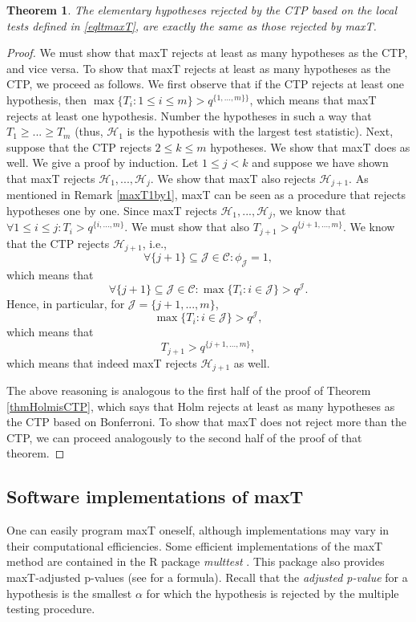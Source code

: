 \documentclass[11pt]{article}
\theoremstyle{plain}
\newtheorem{theorem}{Theorem}[section]
\theoremstyle{definition}
\newcommand{\J}{\mathcal{J}}
\newcommand{\Hy}{\mathcal{H}}
\newcommand{\subs}{\mathcal{C}}
\newcommand{\citp}{\citep}
\begin{document}
\begin{theorem}
The elementary hypotheses rejected by the CTP based on the local tests defined in \eqref{eqltmaxT}, are exactly the same as those rejected by maxT.
\end{theorem}

\begin{proof}
We must show that maxT rejects at least as many hypotheses as the CTP, and vice versa. 
To show that maxT rejects at least as many hypotheses as the CTP, we proceed as follows. 
We first observe that if the CTP rejects at least one hypothesis, then $ \max\{T_i:1\leq i \leq m\} > q^{\{1,...,m\}\}}  $, which means that maxT rejects at least one hypothesis. Number the hypotheses in such a way that
$T_{1}\geq ... \geq T_{m}$ (thus, $\Hy_1$ is the hypothesis with the largest test statistic).
 Next, suppose that 
the CTP rejects $2\leq k \leq m$ hypotheses. We show that maxT  does as well. We give a proof by induction.
Let $1\leq j< k$ and suppose we have shown that maxT rejects $\Hy_1,...,\Hy_j$. We show that maxT also rejects $\Hy_{j+1}$.
As mentioned in Remark \ref{maxT1by1}, maxT can be seen as a procedure that rejects hypotheses one by one.
Since maxT rejects  $\Hy_1,...,\Hy_j$, we know that $\forall 1\leq i\leq j:  T_i> q^{\{i,...,m\}}$. We must show that also 
$T_{j+1}> q^{\{j+1,...,m\}}$. We know that the CTP rejects $\Hy_{j+1}$, i.e., 
$$ \forall \{{j+1}\} \subseteq \J \in \subs: \phi_{\J}=1  ,$$
which means that
$$ \forall\{{j+1}\} \subseteq \J \in \subs: \max\{T_i: i\in \J\}> q^{\J}.$$
Hence, in particular, for $\J=\{j+1,...,m\}$,
$$\max\{T_i: i\in \J\}> q^{\J},$$
which means that
$$T_{j+1}> q^{\{j+1,...,m\}},$$ which means that indeed maxT rejects $\Hy_{j+1}$ as well.

The above reasoning is analogous to the first half of the proof of Theorem \ref{thmHolmisCTP}, which says that  Holm rejects at least as many hypotheses as the CTP based on Bonferroni. To show that maxT does not reject more than the CTP, we can proceed analogously to the second half of the proof of that theorem.
\end{proof}




\subsection{Software implementations of maxT}
One can easily program maxT oneself, although implementations may vary in their computational efficiencies.
Some  efficient implementations of the maxT method are contained in the R package \emph{multtest} \citp{pollard2005multiple,multtest}. This package also provides maxT-adjusted p-values (see \citealp{romano2016efficient} for a formula). Recall that the \emph{adjusted p-value} for a hypothesis is the smallest $\alpha$ for which the hypothesis is rejected by the multiple testing procedure.
\end{document}
